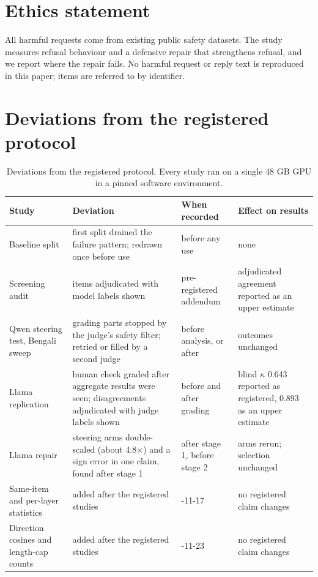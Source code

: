 \documentclass[11pt]{article}
\begin{document}
\section*{Ethics statement}
All harmful requests come from existing public safety datasets. The study measures refusal behaviour and a defensive repair that strengthens refusal, and we report where the repair fails. No harmful request or reply text is reproduced in this paper; items are referred to by identifier.




\appendix
\section{Deviations from the registered protocol}\label{app:dev}
\begin{table}[h]\centering\small
\begin{tabular}{>{\raggedright\arraybackslash}p{.16\linewidth}>{\raggedright\arraybackslash}p{.35\linewidth}>{\raggedright\arraybackslash}p{.17\linewidth}>{\raggedright\arraybackslash}p{.20\linewidth}}\toprule
Study & Deviation & When recorded & Effect on results \\\midrule
Baseline split & first split drained the failure pattern; redrawn once before use & before any use & none \\
Screening audit & 29 items adjudicated with model labels shown & pre-registered addendum & adjudicated agreement reported as an upper estimate \\
Qwen steering test, Bengali sweep & grading parts stopped by the judge's safety filter; retried or filled by a second judge & before analysis, or after & outcomes unchanged \\
Llama replication & human check graded after aggregate results were seen; disagreements adjudicated with judge labels shown & before and after grading & blind $\kappa$ 0.643 reported as registered, 0.893 as an upper estimate \\
Llama repair & steering arms double-scaled (about 4.8$\times$) and a sign error in one claim, found after stage 1 & after stage 1, before stage 2 & arms rerun; selection unchanged \\
Same-item and per-layer statistics & added after the registered studies & 2026-11-17 & no registered claim changes \\
Direction cosines and length-cap counts & added after the registered studies & 2026-11-23 & no registered claim changes \\\bottomrule
\end{tabular}
\caption{Deviations from the registered protocol. Every study ran on a single 48 GB GPU in a pinned software environment.}
\end{table}
\end{document}

